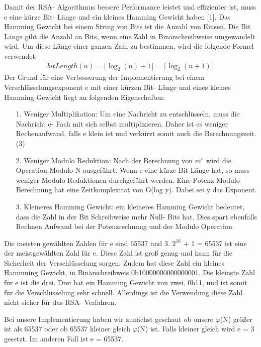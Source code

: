 \documentclass[course=asp]{aspdoc}
\begin{document}
Damit der RSA- Algorithmus bessere Performance leistet und effizienter ist, muss e eine kürze Bit- Länge und ein kleines Hamming Gewicht haben [1]. Das Hamming Gewicht bei einem String von Bits ist die Anzahl von Einsen. Die Bit Länge gibt die Anzahl an Bits, wenn eine Zahl in Binärschreibweise umgewandelt wird. Um diese Länge einer ganzen Zahl zu bestimmen, wird die folgende Formel verwendet:
\begin{align}
	bitLength(n) = \lfloor \log_{2}(n) + 1 \rfloor = \lceil \log_{2}(n + 1)\rceil
\end{align}
Der Grund für eine Verbesserung der Implementierung bei einem Verschlüsselungsexponent e mit einer kürzen Bit- Länge und eines kleines Hamming Gewicht liegt an folgenden Eigenschaften:
\begin{itemize}
 \item [1.] Weniger Multiplikation: Um eine Nachricht zu entschlüsseln, muss die Nachricht e- Fach mit sich selbst multiplizieren. Daher ist es weniger Rechenaufwand, falls e klein ist und verkürzt somit auch die Berechnungszeit.(3)
 \item [2.] Weniger Modulo Reduktion: Nach der Berechnung von $m^{e}$ wird die Operation Modulo N ausgeführt. Wenn e eine kürze Bit Länge hat, so muss weniger Modulo Reduktionen durchgeführt werden. Eine Potenz Modulo Berechnung hat eine Zeitkomplexität von O(log y). Dabei sei y das Exponent.   
 \item [3.] Kleineres Hamming Gewicht: ein kleineres Hamming Gewicht bedeutet, dass die Zahl in der Bit Schreibweise mehr Null- Bits hat. Dies spart ebenfalls Rechnen Aufwand bei der Potenzrechnung und der Modulo Operation.
\end{itemize}
Die meisten gewählten Zahlen für e sind 65537 und 3. $2^{16}$ + 1 = 65537 ist eine der meistgewählten Zahl für e. Diese Zahl ist groß genug und kann für die Sicherheit der Verschlüsselung sorgen. Zudem hat diese Zahl ein kleines Hammning Gewicht, in Binärschreibweis 0b10000000000000001. Die kleinste Zahl für e ist die drei. Drei hat ein Hamming Gewicht von zwei, 0b11, und ist somit für die Verschlüsselung sehr schnell. Allerdings ist die Verwendung diese Zahl nicht sicher für das RSA- Verfahren. 

Bei unsere Implementierung haben wir zunächst geschaut ob unsere $\varphi $(N) größer ist als 65537 oder ob 65537 kleiner gleich $\varphi $(N) ist. Falls kleiner gleich wird e = 3 gesetzt. Im anderen Fall ist e = 65537.
\end{document}
